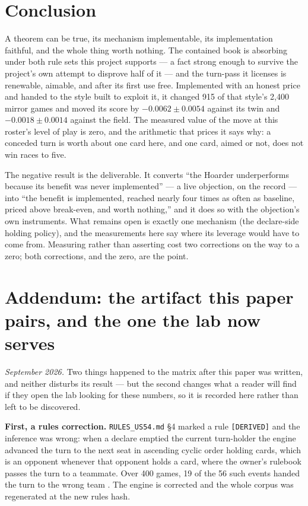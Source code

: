 \documentclass[11pt]{article}
\newcommand{\code}[1]{\texttt{#1}}
\begin{document}
\section{Conclusion}
\label{sec:conclusion}

A theorem can be true, its mechanism implementable, its implementation
faithful, and the whole thing worth nothing. The contained book is absorbing
under both rule sets this project supports --- a fact strong enough to
survive the project's own attempt to disprove half of it --- and the
turn-pass it licenses is renewable, aimable, and after its first use free.
Implemented with an honest price and handed to the style built to exploit
it, it changed 915 of that style's 2{,}400 mirror games and moved its score
by $-0.0062 \pm 0.0054$ against its twin and $-0.0018 \pm 0.0014$ against
the field. The measured value of the move at this roster's level of play is
zero, and the arithmetic that prices it says why: a conceded turn is worth
about one card here, and one card, aimed or not, does not win races to five.

The negative result is the deliverable. It converts ``the Hoarder
underperforms because its benefit was never implemented'' --- a live
objection, on the record --- into ``the benefit is implemented, reached
nearly four times as often as baseline, priced above break-even, and worth
nothing,'' and it does so with the objection's own instruments. What remains
open is exactly one mechanism (the declare-side holding policy), and the
measurements here say where its leverage would have to come from. Measuring
rather than asserting cost two corrections on the way to a zero; both
corrections, and the zero, are the point.

\section{Addendum: the artifact this paper pairs, and the one the lab now serves}
\label{sec:addregen}

\emph{September 2026.} Two things happened to the matrix after this paper was written, and
neither disturbs its result --- but the second changes what a reader will find if they open the
lab looking for these numbers, so it is recorded here rather than left to be discovered.

\textbf{First, a rules correction.} \code{RULES\_US54.md} \S4 marked a rule \code{[DERIVED]} and
the inference was wrong: when a declare emptied the current turn-holder the engine advanced the
turn to the next seat in ascending cyclic order holding cards, which is an opponent whenever that
opponent holds a card, where the owner's rulebook passes the turn to a teammate. Over 400 games,
19 of the 56 such events handed the turn to the wrong team \cite{rules54}. The engine is
corrected and the whole corpus was regenerated at the new rules hash.
\end{document}
